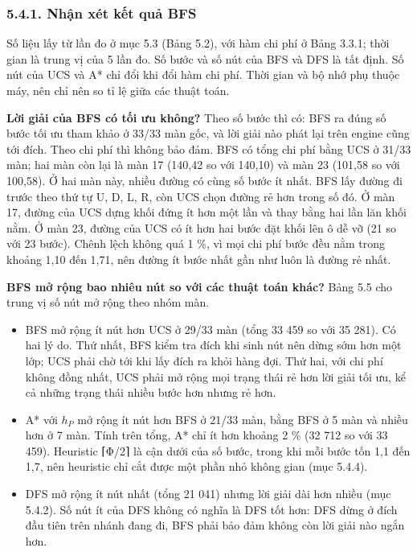 \subsubsection{5.4.1. Nhận xét kết quả BFS}

Số liệu lấy từ lần đo ở mục 5.3 (Bảng 5.2), với hàm chi phí ở Bảng 3.3.1; thời gian là trung vị của 5 lần đo. Số bước và số nút của BFS và DFS là tất định. Số nút của UCS và A* chỉ đổi khi đổi hàm chi phí. Thời gian và bộ nhớ phụ thuộc máy, nên chỉ nên so tỉ lệ giữa các thuật toán.

\textbf{Lời giải của BFS có tối ưu không?} Theo số bước thì có: BFS ra đúng số bước tối ưu tham khảo ở 33/33 màn gốc, và lời giải nào phát lại trên engine cũng tới đích. Theo chi phí thì không bảo đảm. BFS có tổng chi phí bằng UCS ở 31/33 màn; hai màn còn lại là màn 17 (140,42 so với 140,10) và màn 23 (101,58 so với 100,58). Ở hai màn này, nhiều đường có cùng số bước ít nhất. BFS lấy đường đi trước theo thứ tự U, D, L, R, còn UCS chọn đường rẻ hơn trong số đó. Ở màn 17, đường của UCS dựng khối đứng ít hơn một lần và thay bằng hai lần lăn khối nằm. Ở màn 23, đường của UCS có ít hơn hai bước đặt khối lên ô dễ vỡ (21 so với 23 bước). Chênh lệch không quá 1 \%, vì mọi chi phí bước đều nằm trong khoảng 1,10 đến 1,71, nên đường ít bước nhất gần như luôn là đường rẻ nhất.

\textbf{BFS mở rộng bao nhiêu nút so với các thuật toán khác?} Bảng 5.5 cho trung vị số nút mở rộng theo nhóm màn.

\begin{itemize}
\tightlist
\item
  BFS mở rộng ít nút hơn UCS ở 29/33 màn (tổng 33 459 so với 35 281). Có hai lý do. Thứ nhất, BFS kiểm tra đích khi sinh nút nên dừng sớm hơn một lớp; UCS phải chờ tới khi lấy đích ra khỏi hàng đợi. Thứ hai, với chi phí không đồng nhất, UCS phải mở rộng mọi trạng thái rẻ hơn lời giải tối ưu, kể cả những trạng thái nhiều bước hơn nhưng rẻ hơn.
\item
  A* với \(h_P\) mở rộng ít nút hơn BFS ở 21/33 màn, bằng BFS ở 5 màn và nhiều hơn ở 7 màn. Tính trên tổng, A* chỉ ít hơn khoảng 2 \% (32 712 so với 33 459). Heuristic ⌈Φ/2⌉ là cận dưới của số bước, trong khi mỗi bước tốn 1,1 đến 1,7, nên heuristic chỉ cắt được một phần nhỏ không gian (mục 5.4.4).
\item
  DFS mở rộng ít nút nhất (tổng 21 041) nhưng lời giải dài hơn nhiều (mục 5.4.2). Số nút ít của DFS không có nghĩa là DFS tốt hơn: DFS dừng ở đích đầu tiên trên nhánh đang đi, BFS phải bảo đảm không còn lời giải nào ngắn hơn.
\end{itemize}

